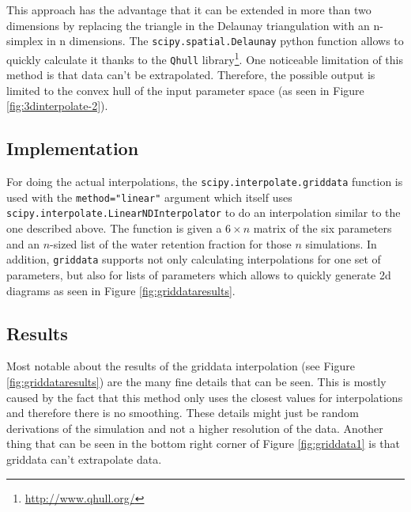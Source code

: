 This approach has the advantage that it can be extended in more than two dimensions by replacing the triangle in the Delaunay triangulation with an n-simplex in n dimensions. The \texttt{scipy.spatial.Delaunay} python function allows to quickly calculate it thanks to the \texttt{Qhull} library\footnote{\url{http://www.qhull.org/}}. One noticeable limitation of this method is that data can't be extrapolated. Therefore, the possible output is limited to the convex hull of the input parameter space (as seen in Figure \ref{fig:3dinterpolate-2}).

\subsection{Implementation}
\label{sec:griddata-implementation}
For doing the actual interpolations, the \texttt{scipy.interpolate.griddata} function is used with the \texttt{method="linear"} argument which itself uses \texttt{scipy.interpolate.LinearNDInterpolator} to do an interpolation similar to the one described above. The function is given a $6\times n$ matrix of the six parameters and an $n$-sized list of the water retention fraction for those $n$ simulations. In addition, \texttt{griddata} supports not only calculating interpolations for one set of parameters, but also for lists of parameters which allows to quickly generate 2d diagrams as seen in  Figure \ref{fig:griddataresults}.

\subsection{Results}

Most notable about the results of the griddata interpolation (see Figure \ref{fig:griddataresults}) are the many fine details that can be seen. This is mostly caused by the fact that this method only uses the closest values for interpolations and therefore there is no smoothing. These details might just be random derivations of the simulation and not a higher resolution of the data. Another thing that can be seen in the bottom right corner of Figure \ref{fig:griddata1} is that griddata can't extrapolate data.

